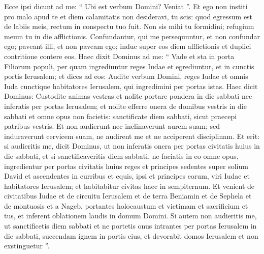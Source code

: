 \begin{biblechapter}
\begin{biblechapter}
\begin{biblechapter}
\begin{biblechapter}
\begin{biblechapter}
\begin{biblechapter}
\begin{biblechapter}
\begin{biblechapter}
\begin{biblechapter}
\begin{biblechapter}
\begin{biblechapter}
\begin{biblechapter}
\begin{biblechapter}
\begin{biblechapter}
\begin{biblechapter}
\begin{biblechapter}
\begin{biblechapter}
 \verse Ecce ipsi dicunt ad me:
 “ Ubi est verbum Domini? Veniat ”.
 \verse Et ego non institi pro malo apud te
 et diem calamitatis non desideravi,
 tu scis: quod egressum est de labiis meis,
 rectum in conspectu tuo fuit.
 \verse Non sis mihi tu formidini;
 refugium meum tu in die afflictionis.
 \verse Confundantur, qui me persequuntur,
 et non confundar ego;
 paveant illi, et non paveam ego;
 induc super eos diem afflictionis
 et duplici contritione contere eos.
 \verse Haec dixit Dominus ad me: “ Vade et sta in porta Filiorum populi, per quam ingrediuntur reges Iudae et egrediuntur, et in cunctis portis Ierusalem; 
\verse et dices ad eos: Audite verbum Domini, reges Iudae et omnis Iuda cunctique habitatores Ierusalem, qui ingredimini per portas istas. 
\verse Haec dicit Dominus: Custodite animas vestras et nolite portare pondera in die sabbati nec inferatis per portas Ierusalem; 
\verse et nolite efferre onera de domibus vestris in die sabbati et omne opus non facietis: sanctificate diem sabbati, sicut praecepi patribus vestris. 
\verse Et non audierunt nec inclinaverunt aurem suam; sed induraverunt cervicem suam, ne audirent me et ne acciperent disciplinam. 
\verse Et erit: si audieritis me, dicit Dominus, ut non inferatis onera per portas civitatis huius in die sabbati, et si sanctificaveritis diem sabbati, ne faciatis in eo omne opus, 
\verse ingredientur per portas civitatis huius reges et principes sedentes super solium David et ascendentes in curribus et equis, ipsi et principes eorum, viri Iudae et habitatores Ierusalem; et habitabitur civitas haec in sempiternum. 
\verse Et venient de civitatibus Iudae et de circuitu Ierusalem et de terra Beniamin et de Sephela et de montuosis et a Nageb, portantes holocaustum et victimam et sacrificium et tus, et inferent oblationem laudis in domum Domini. 
\verse Si autem non audieritis me, ut sanctificetis diem sabbati et ne portetis onus intrantes per portas Ierusalem in die sabbati, succendam ignem in portis eius, et devorabit domos Ierusalem et non exstinguetur ”.
 

\end{biblechapter}
\end{biblechapter}
\end{biblechapter}
\end{biblechapter}
\end{biblechapter}
\end{biblechapter}
\end{biblechapter}
\end{biblechapter}
\end{biblechapter}
\end{biblechapter}
\end{biblechapter}
\end{biblechapter}
\end{biblechapter}
\end{biblechapter}
\end{biblechapter}
\end{biblechapter}
\end{biblechapter}
